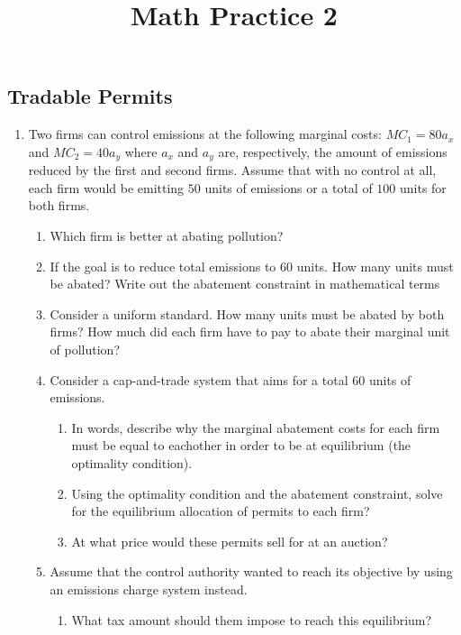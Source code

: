 \documentclass[11pt]{article}
\title{Math Practice 2}
\begin{document}
\subsection*{Tradable Permits}

\begin{enumerate}
  \item Two firms can control emissions at the following marginal costs: $MC_1 = 80a_x$ and $MC_2 = 40 a_y$ where $a_x$ and $a_y$ are, respectively, the amount of emissions reduced by the first and second firms. Assume that with no control at all, each firm would be emitting $50$ units of emissions or a total of $100$ units for both firms.

  \begin{enumerate}
    \item Which firm is better at abating pollution?
    
    \item If the goal is to reduce total emissions to $60$ units. How many units must be abated? Write out the abatement constraint in mathematical terms
    
    \item Consider a uniform standard. How many units must be abated by both firms? How much did each firm have to pay to abate their marginal unit of pollution?
  
    \item Consider a cap-and-trade system that aims for a total $60$ units of emissions. 
    \begin{enumerate}
      \item In words, describe why the marginal abatement costs for each firm must be equal to eachother in order to be at equilibrium (the optimality condition). 
      
      \item Using the optimality condition and the abatement constraint, solve for the equilibrium allocation of permits to each firm?
  
      \item At what price would these permits sell for at an auction?
    \end{enumerate}
  
    \item Assume that the control authority wanted to reach its objective by using an emissions charge system instead.
    \begin{enumerate}
      \item What tax amount should them impose to reach this equilibrium?
      

\end{enumerate}
\end{enumerate}
\end{enumerate}
\end{document}
